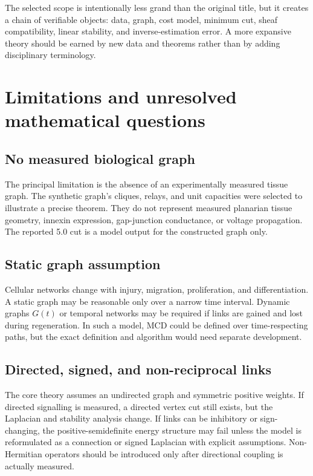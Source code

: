 \documentclass[12pt,a4paper]{article}
\begin{document}
The selected scope is intentionally less grand than the original title, but it creates a chain of verifiable objects: data, graph, cost model, minimum cut, sheaf compatibility, linear stability, and inverse-estimation error. A more expansive theory should be earned by new data and theorems rather than by adding disciplinary terminology.

\section{Limitations and unresolved mathematical questions}
\subsection{No measured biological graph}
The principal limitation is the absence of an experimentally measured tissue graph. The synthetic graph's cliques, relays, and unit capacities were selected to illustrate a precise theorem. They do not represent measured planarian tissue geometry, innexin expression, gap-junction conductance, or voltage propagation. The reported 5.0 cut is a model output for the constructed graph only.

\subsection{Static graph assumption}
Cellular networks change with injury, migration, proliferation, and differentiation. A static graph may be reasonable only over a narrow time interval. Dynamic graphs \(G(t)\) or temporal networks may be required if links are gained and lost during regeneration. In such a model, MCD could be defined over time-respecting paths, but the exact definition and algorithm would need separate development.

\subsection{Directed, signed, and non-reciprocal links}
The core theory assumes an undirected graph and symmetric positive weights. If directed signalling is measured, a directed vertex cut still exists, but the Laplacian and stability analysis change. If links can be inhibitory or sign-changing, the positive-semidefinite energy structure may fail unless the model is reformulated as a connection or signed Laplacian with explicit assumptions. Non-Hermitian operators should be introduced only after directional coupling is actually measured.
\end{document}
